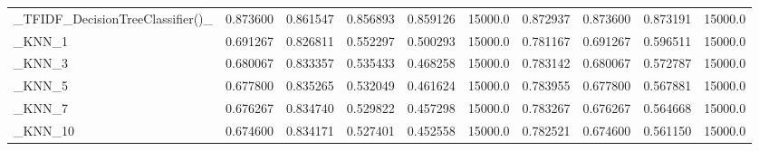 \begin{tabular}{lrrrrrrrrr}
\_TFIDF\_DecisionTreeClassifier()\_                   &  0.873600 &         0.861547 &      0.856893 &        0.859126 &        15000.0 &            0.872937 &         0.873600 &           0.873191 &           15000.0 \\
\_KNN\_1                                             &  0.691267 &         0.826811 &      0.552297 &        0.500293 &        15000.0 &            0.781167 &         0.691267 &           0.596511 &           15000.0 \\
\_KNN\_3                                             &  0.680067 &         0.833357 &      0.535433 &        0.468258 &        15000.0 &            0.783142 &         0.680067 &           0.572787 &           15000.0 \\
\_KNN\_5                                             &  0.677800 &         0.835265 &      0.532049 &        0.461624 &        15000.0 &            0.783955 &         0.677800 &           0.567881 &           15000.0 \\
\_KNN\_7                                             &  0.676267 &         0.834740 &      0.529822 &        0.457298 &        15000.0 &            0.783267 &         0.676267 &           0.564668 &           15000.0 \\
\_KNN\_10                                            &  0.674600 &         0.834171 &      0.527401 &        0.452558 &        15000.0 &            0.782521 &         0.674600 &           0.561150 &           15000.0 \\
\bottomrule
\end{tabular}
